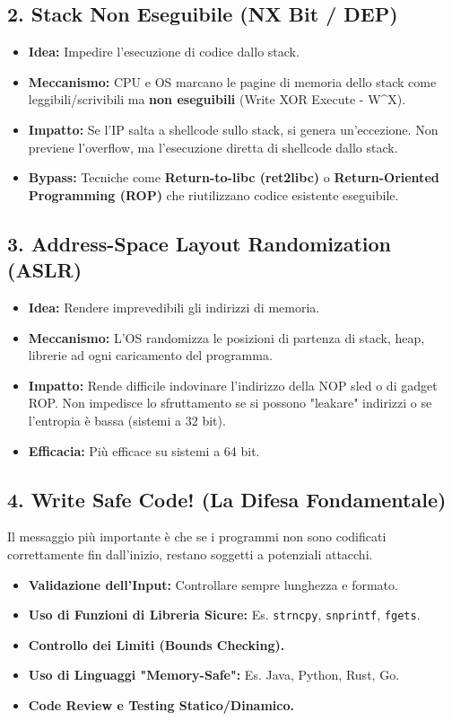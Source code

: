 \documentclass{article}
\begin{document}
\subsection{2. Stack Non Eseguibile (NX Bit / DEP)}
\begin{itemize}
    \item \textbf{Idea:} Impedire l'esecuzione di codice dallo stack.
    \item \textbf{Meccanismo:} CPU e OS marcano le pagine di memoria dello stack come leggibili/scrivibili ma \textbf{non eseguibili} (Write XOR Execute - W\textasciicircum X).
    \item \textbf{Impatto:} Se l'IP salta a shellcode sullo stack, si genera un'eccezione. Non previene l'overflow, ma l'esecuzione diretta di shellcode dallo stack.
    \item \textbf{Bypass:} Tecniche come \textbf{Return-to-libc (ret2libc)} o \textbf{Return-Oriented Programming (ROP)} che riutilizzano codice esistente eseguibile.
\end{itemize}

\subsection{3. Address-Space Layout Randomization (ASLR)}
\begin{itemize}
    \item \textbf{Idea:} Rendere imprevedibili gli indirizzi di memoria.
    \item \textbf{Meccanismo:} L'OS randomizza le posizioni di partenza di stack, heap, librerie ad ogni caricamento del programma.
    \item \textbf{Impatto:} Rende difficile indovinare l'indirizzo della NOP sled o di gadget ROP. Non impedisce lo sfruttamento se si possono "leakare" indirizzi o se l'entropia è bassa (sistemi a 32 bit).
    \item \textbf{Efficacia:} Più efficace su sistemi a 64 bit.
\end{itemize}

\subsection{4. Write Safe Code! (La Difesa Fondamentale)}
Il messaggio più importante è che se i programmi non sono codificati correttamente fin dall'inizio, restano soggetti a potenziali attacchi.
\begin{itemize}
    \item \textbf{Validazione dell'Input:} Controllare sempre lunghezza e formato.
    \item \textbf{Uso di Funzioni di Libreria Sicure:} Es. \texttt{strncpy}, \texttt{snprintf}, \texttt{fgets}.
    \item \textbf{Controllo dei Limiti (Bounds Checking).}
    \item \textbf{Uso di Linguaggi "Memory-Safe":} Es. Java, Python, Rust, Go.
    \item \textbf{Code Review e Testing Statico/Dinamico.}
\end{itemize}
\end{document}
